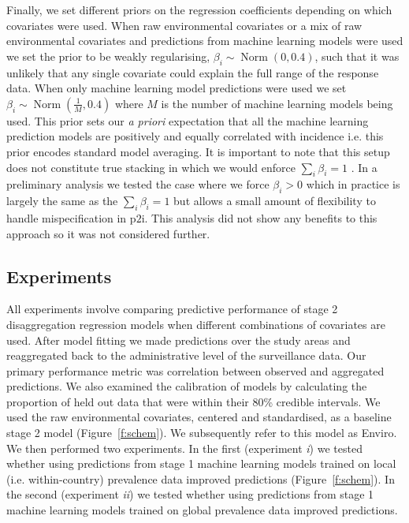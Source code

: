 \documentclass[review]{elsarticle}
\begin{document}
Finally, we set different priors on the regression coefficients depending on which covariates were used.
When raw environmental covariates or a mix of raw environmental covariates and predictions from machine learning models were used we set the prior to be weakly regularising, $\beta_i \sim \operatorname{Norm}(0, 0.4)$, such that it was unlikely that any single covariate could explain the full range of the response data.
When only machine learning model predictions were used we set $\beta_i \sim \operatorname{ Norm}(\frac{1}{M}, 0.4)$ where $M$ is the number of machine learning models being used. 
This prior  sets our \emph{a priori} expectation that all the machine learning prediction models are positively and equally correlated with incidence i.e. this prior encodes standard model averaging.
It is important to note that this setup does not constitute true stacking in which we would enforce $\sum_i \beta_i = 1$ \citep{bhatt2017improved}.
In a preliminary analysis we tested the case where we force $\beta_i > 0$ which in practice is largely the same as the $\sum_i \beta_i = 1$  \citep{breiman1996stacked} but allows a small amount of flexibility to handle mispecification in $\mathrm{p2i}$.
This analysis did not show any benefits to this approach so it was not considered further.



\subsection{Experiments}



All experiments involve comparing predictive performance of stage 2 disaggregation regression models when different combinations of covariates are used.
After model fitting we made predictions over the study areas and reaggregated back to the administrative level of the surveillance data.
Our primary performance metric was correlation between observed and aggregated predictions.
We also examined the calibration of models by calculating the proportion of held out data that were within their 80\% credible intervals.
We used the raw environmental covariates, centered and standardised, as a baseline stage 2 model (Figure~\ref{f:schem}).
We subsequently refer to this model as Enviro.
We then performed two experiments.
In the first (experiment \emph{i}) we tested whether using predictions from stage 1 machine learning models trained on local (i.e. within-country) prevalence data improved predictions (Figure~\ref{f:schem}).
In the second (experiment \emph{ii}) we tested whether using predictions from stage 1 machine learning models trained on global prevalence data improved predictions.
\end{document}

